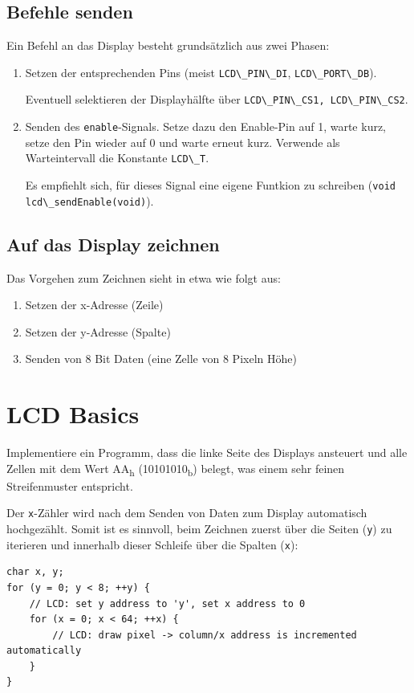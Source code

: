 \subsection*{Befehle senden}
Ein Befehl an das Display besteht grundsätzlich aus zwei Phasen:
\begin{enumerate}
\item
Setzen der entsprechenden Pins (meist \lstinline{LCD\_PIN\_DI}, \lstinline{LCD\_PORT\_DB}).

Eventuell selektieren der Displayhälfte über \lstinline{LCD\_PIN\_CS1, LCD\_PIN\_CS2}.

\item
Senden des \lstinline{enable}-Signals.
Setze dazu den Enable-Pin auf 1, warte kurz, setze den Pin wieder auf 0 und warte erneut kurz.
Verwende als Warteintervall die Konstante \lstinline{LCD\_T}.

Es empfiehlt sich, für dieses Signal eine eigene Funtkion zu schreiben (\lstinline{void lcd\_sendEnable(void)}).
\end{enumerate}

\subsection*{Auf das Display zeichnen}

Das Vorgehen zum Zeichnen sieht in etwa wie folgt aus:
\begin{enumerate}
	\item Setzen der x-Adresse (Zeile)
	\item Setzen der y-Adresse (Spalte)
	\item Senden von 8 Bit Daten (eine \glqq{}Zelle\grqq{} von 8 Pixeln Höhe)
\end{enumerate}



\section{LCD Basics}
Implementiere ein Programm, dass die linke Seite des Displays ansteuert und alle Zellen mit dem Wert AA\textsubscript{h} (10101010\textsubscript{b}) belegt, was einem sehr feinen Streifenmuster entspricht.

Der \lstinline{x}-Zähler wird nach dem Senden von Daten zum Display automatisch hochgezählt.
Somit ist es sinnvoll, beim Zeichnen zuerst über die Seiten (\lstinline{y}) zu iterieren und innerhalb dieser Schleife über die Spalten (\lstinline{x}):
\begin{lstlisting}
char x, y;
for (y = 0; y < 8; ++y) {
	// LCD: set y address to 'y', set x address to 0
	for (x = 0; x < 64; ++x) {
	    // LCD: draw pixel -> column/x address is incremented automatically
	}
}
\end{lstlisting}

